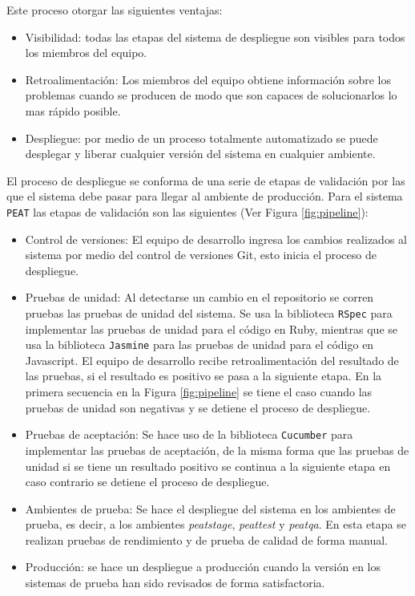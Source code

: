 Este proceso otorgar las siguientes ventajas:
\begin{itemize}
\item Visibilidad: todas las etapas del sistema de despliegue son visibles
  para todos los miembros del equipo.
\item Retroalimentación: Los miembros del equipo obtiene información sobre los
  problemas cuando se producen de modo que son capaces de solucionarlos lo mas
  rápido posible.
\item Despliegue: por medio de un proceso totalmente automatizado se puede
  desplegar y liberar cualquier versión del sistema en cualquier ambiente.
\end{itemize}

El proceso de despliegue se conforma de una serie de etapas de validación por las
que el sistema debe pasar para llegar al ambiente de producción. Para el sistema
\texttt{PEAT} las etapas de validación son las siguientes (Ver Figura
\ref{fig:pipeline}):
\begin{itemize}
\item Control de versiones: El equipo de desarrollo ingresa los cambios
  realizados al sistema por medio del control de versiones Git, esto inicia
  el proceso de despliegue.
\item Pruebas de unidad: Al detectarse un cambio en el repositorio se corren
  pruebas las pruebas de unidad del sistema. Se usa la biblioteca \texttt{RSpec}
  para implementar las pruebas de unidad para el código en Ruby, mientras que se
  usa la biblioteca \texttt{Jasmine} para las pruebas de unidad para el código en
  Javascript. El equipo de desarrollo recibe retroalimentación del resultado de
  las pruebas, si el resultado es positivo se pasa a la siguiente etapa.
  En la primera secuencia en la Figura \ref{fig:pipeline} se tiene el caso
  cuando las pruebas de unidad son negativas y se detiene el proceso de despliegue.
\item Pruebas de aceptación: Se hace uso de la biblioteca \texttt{Cucumber}
  para implementar las pruebas de aceptación, de la misma forma que las pruebas
  de unidad si se tiene un resultado positivo se continua a la siguiente etapa en
  caso contrario se detiene el proceso de despliegue.
\item Ambientes de prueba: Se hace el despliegue del sistema en los ambientes de
  prueba, es decir, a los ambientes \textit{peatstage}, \textit{peattest} y
  \textit{peatqa}. En esta etapa se realizan pruebas de rendimiento y de prueba
  de calidad de forma manual.
\item Producción: se hace un despliegue a producción cuando la versión en los
  sistemas de prueba han sido revisados de forma satisfactoria.
\end{itemize}

